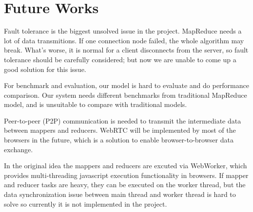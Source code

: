 \section{Future Works}

Fault tolerance is the biggest unsolved issue in the project. MapReduce needs a lot of data transmitions. If one connection node failed, the whole algorithm may break.
What's worse, it is normal for a client disconnects from the server, so fault tolerance should be carefully considered; but now we are unable to come up a good solution for this issue.

For benchmark and evaluation, our model is hard to evaluate and do performance comparison. Our system needs different benchmarks from traditional MapReduce model, and is unsuitable to compare with traditional models.

Peer-to-peer (P2P) communication is needed to transmit the intermediate data between mappers and reducers. WebRTC\cite{webRTC} will be implemented by most of the browsers in the future, which is a solution to enable browser-to-browser data exchange.

In the original idea the mappers and reducers are excuted via WebWorker\cite{webworker}, which provides multi-threading javascript execution functionality in browsers. If mapper and reducer tasks are heavy, they can be executed on the worker thread, but the data synchronization issue between main thread and worker thread is hard to solve so currently it is not implemented in the project.
